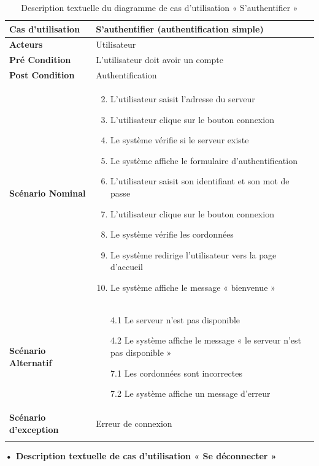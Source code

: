 \begin{longtable}{|p{5cm}|p{10cm}|}
\hline
\textbf{Cas d'utilisation}&S'authentifier (authentification simple)\\
\hline
\textbf{Acteurs}&Utilisateur\\
\hline
\textbf{Pré Condition}&L'utilisateur doit avoir un compte\\
\hline
\textbf{Post Condition}&Authentification\\
\hline
\textbf{Scénario Nominal}&
\vspace{-\baselineskip}
\begin{enumerate}
    \setcounter{enumi}{1}
  \item L'utilisateur saisit l'adresse du serveur
  \item L'utilisateur clique sur le bouton connexion
  \item Le système vérifie si le serveur existe
  \item Le système affiche le formulaire d'authentification
  \item L'utilisateur saisit son identifiant et son mot de passe
  \item L'utilisateur clique sur le bouton connexion
  \item Le système vérifie les cordonnées
  \item Le système redirige l'utilisateur vers la page d'accueil
  \item Le système affiche le message « bienvenue »
\end{enumerate}\\
\hline
\textbf{Scénario Alternatif}&
\vspace{-\baselineskip}
\begin{enumerate}
      \item [4.1] Le serveur n'est pas disponible
      \item [4.2] Le système affiche le message « le serveur n'est pas disponible »
      \item [7.1] Les cordonnées sont incorrectes
      \item [7.2] Le système affiche un message d'erreur
\end{enumerate}\\
\hline
\textbf{Scénario d'exception}&Erreur de connexion\\
\hline
\caption{Description textuelle du diagramme de cas d'utilisation « S'authentifier »}
\label{tab:use_case_simple_authentification}
\end{longtable}

\textbf{•	Description textuelle de cas d'utilisation « Se déconnecter »}

